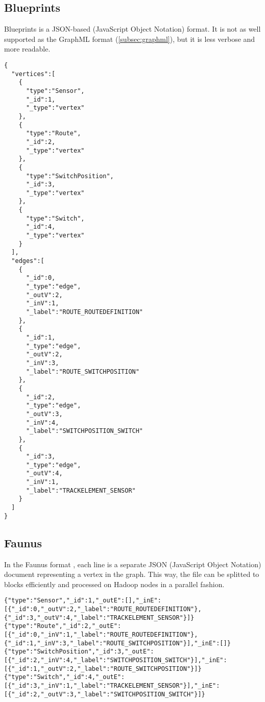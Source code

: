 \subsection{Blueprints \graphson{}}
\label{blueprints-graphson-example}

Blueprints \graphson{} \cite{BlueprintsGraphSON} is a JSON-based (JavaScript Object Notation) format. It is not as well supported as the GraphML format (\autoref{subsec:graphml}), but it is less verbose and more readable.

\lstset{language=json,firstnumber=1}
\begin{lstlisting}[caption=A graph based on the railway system metamodel stored in Blueprints \graphson{} format]
{
  "vertices":[
    {
      "type":"Sensor",
      "_id":1,
      "_type":"vertex"
    },
    {
      "type":"Route",
      "_id":2,
      "_type":"vertex"
    },
    {
      "type":"SwitchPosition",
      "_id":3,
      "_type":"vertex"
    },
    {
      "type":"Switch",
      "_id":4,
      "_type":"vertex"
    }
  ],
  "edges":[
    {
      "_id":0,
      "_type":"edge",
      "_outV":2,
      "_inV":1,
      "_label":"ROUTE_ROUTEDEFINITION"
    },
    {
      "_id":1,
      "_type":"edge",
      "_outV":2,
      "_inV":3,
      "_label":"ROUTE_SWITCHPOSITION"
    },
    {
      "_id":2,
      "_type":"edge",
      "_outV":3,
      "_inV":4,
      "_label":"SWITCHPOSITION_SWITCH"
    },
    {
      "_id":3,
      "_type":"edge",
      "_outV":4,
      "_inV":1,
      "_label":"TRACKELEMENT_SENSOR"
    }
  ]
}
\end{lstlisting}

\subsection{Faunus \graphson{}}
\label{faunus-graphson-example}

In the Faunus \graphson{} format \cite{FaunusGraphSON}, each line is a separate JSON (JavaScript Object Notation) document representing a vertex in the graph. This way, the file can be splitted to blocks efficiently and processed on Hadoop nodes in a parallel fashion.   

\begin{lstlisting}[caption=A graph based on the railway system metamodel stored in Faunus \graphson{} format]
{"type":"Sensor","_id":1,"_outE":[],"_inE":[{"_id":0,"_outV":2,"_label":"ROUTE_ROUTEDEFINITION"},{"_id":3,"_outV":4,"_label":"TRACKELEMENT_SENSOR"}]}
{"type":"Route","_id":2,"_outE":[{"_id":0,"_inV":1,"_label":"ROUTE_ROUTEDEFINITION"},{"_id":1,"_inV":3,"_label":"ROUTE_SWITCHPOSITION"}],"_inE":[]}
{"type":"SwitchPosition","_id":3,"_outE":[{"_id":2,"_inV":4,"_label":"SWITCHPOSITION_SWITCH"}],"_inE":[{"_id":1,"_outV":2,"_label":"ROUTE_SWITCHPOSITION"}]}
{"type":"Switch","_id":4,"_outE":[{"_id":3,"_inV":1,"_label":"TRACKELEMENT_SENSOR"}],"_inE":[{"_id":2,"_outV":3,"_label":"SWITCHPOSITION_SWITCH"}]}
\end{lstlisting}

